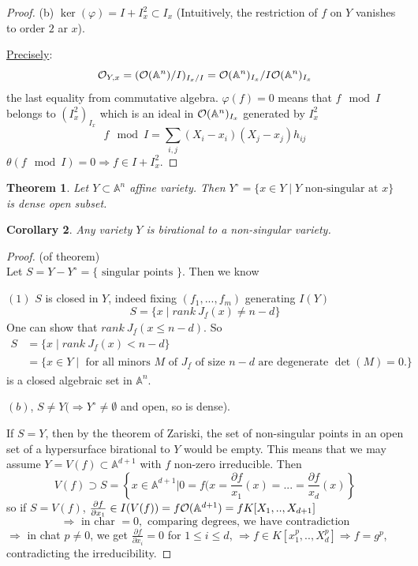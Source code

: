 \documentclass[11pt]{article}
\newtheorem{thm}{Theorem}[section]
\newtheorem{cor}[thm]{Corollary}
\newcommand{\affn}{\mathbb A}
\newcommand{\calo}{{\cal O}}
\newcommand{\pd}{\partial}
\newcommand{\Lrta}{\Longrightarrow}
\begin{document}
\begin{proof}
	(b) $\ker(\varphi)=I+I_x^2\subset I_x$ (Intuitively, the restriction of $f$ on $Y$ vanishes to order $2$ ar $x$). 
	
	\underline{Precisely}: 
	$$
	\calo_{Y,x}=(\calo(\affn^n)/I)_{I_x/I}=\calo(\affn^n)_{I_x}/I\calo(\affn^n)_{I_x}
	$$
	the last equality from commutative algebra. $\varphi(f)=0$ means that $f\mod I$ belongs to $(I_x^2)_{I_x}$ which is an ideal in $\calo(\affn^n)_{I_x}$ generated by $I_x^2$
	$$
	f\mod I=\sum_{i,j}(X_i-x_i)(X_j-x_j)h_{ij}
	$$
	$\theta(f\mod I)=0\Lrta f\in I+I_x^2$.
\end{proof}

\begin{thm}
Let $Y\subset \affn^n$ affine variety. Then $Y^\circ =\{x\in Y\mid Y\text{ non-singular at } x\}$  is dense open subset.
\end{thm}
\begin{cor}
Any variety $Y$ is birational to a non-singular variety.
\end{cor}
\begin{proof}
(of theorem)\\
Let $S=Y-Y^\circ=\{\text{ singular points }\}$. Then we know

$(1)$ $S$ is closed in $Y$, indeed fixing $(f_1,...,f_m)$ generating $I(Y)$
$$
S=\{x\mid rank\  J_{\underline{f}}(x)\neq n-d\} 
$$
One can show that $rank\ J_{\underline{f}}(x\leq n-d)$. So
$$
\begin{aligned}
S&=\{x\mid rank\  J_{\underline{f}}(x)< n-d\}\\
&=\{x\in Y\mid \text{ for all minors $M$ of $J_{\underline{f}}$ of size $n-d$ are degenerate $\det (M)=0$.}\}
\end{aligned}
$$
is a closed algebraic set in $\affn^n$.

$(b)$, $S\neq Y(\Lrta Y^\circ\neq \emptyset$ and open, so is dense). 

If $S=Y$, then by the theorem of Zariski, the set of non-singular points in an open set of a hypersurface birational to $Y$ would be empty. This means that we may assume $Y=V(f)\subset \affn^{d+1}$ with $f$ non-zero irreducible.
 Then 
 $$
V(f)\supset S=\left\{x\in \affn^{d+1}|0=f(x=\frac{\pd f}{x_1}(x)=...=\frac{\pd f}{x_d}(x)\right\}
 $$
 so if $S=V(f)$, $\frac{\pd f}{\pd x_1}\in I(V(f))=f\calo(\affn^{d+1})=f K[X_1,..,X_{d+1}]$
 $$
\Lrta \text{ in char }=0, \text{ comparing degrees, we have contradiction}
 $$
 $\Lrta$ in chat $p\neq 0$, we get $\frac{\pd f}{\pd x_i}=0$ for $1\leq i\leq d$,
 $\Lrta f\in K[x_1^p,..,X_d^{p}]\Lrta f=g^p$, contradicting the irreducibility.
\end{proof}
\end{document}
